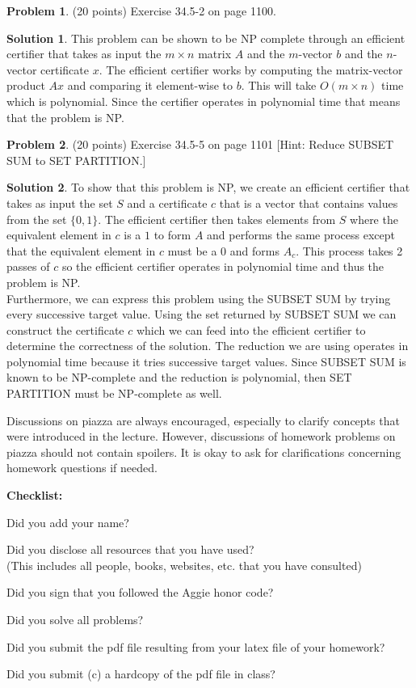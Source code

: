 \documentclass{article}
\theoremstyle{definition}
\newtheorem{problem}{Problem}
\newtheorem*{solution}{Solution}
\newcommand{\checklist}{\noindent\textbf{Checklist:}
\begin{compactitem}[$\Box$] 
\item Did you add your name? 
\item Did you disclose all resources that you have used? \\
(This includes all people, books, websites, etc. that you have consulted)
\item Did you sign that you followed the Aggie honor code? 
\item Did you solve all problems? 
\item Did you submit the pdf file resulting from your latex file 
  of your homework?
\item Did you submit (c) a hardcopy of the pdf file in class? 
\end{compactitem}
}
\begin{document}
\begin{problem} (20 points) %
Exercise 34.5-2 on page 1100. 
\end{problem}
\begin{solution}
This problem can be shown to be NP complete through an efficient certifier that takes as input the $m \times n$ matrix $A$ and the $m$-vector $b$ and the $n$-vector certificate $x$. The efficient certifier works by computing the matrix-vector product $Ax$ and comparing it element-wise to $b$. This will take $O(m \times n)$ time which is polynomial. Since the certifier operates in polynomial time that means that the problem is NP.
\end{solution}

\begin{problem} (20 points) %
Exercise 34.5-5 on page 1101 [Hint: Reduce SUBSET SUM
to SET PARTITION.] 
\end{problem}
\begin{solution}
To show that this problem is NP, we create an efficient certifier that takes as input the set $S$ and a certificate $c$ that is a vector that contains values from the set $\{0,1\}$. The efficient certifier then takes elements from $S$ where the equivalent element in $c$ is a $1$ to form $A$ and performs the same process except that the equivalent element in $c$ must be a 0 and forms $A_c$. This process takes 2 passes of $c$ so the efficient certifier operates in polynomial time and thus the problem is NP.\\
Furthermore, we can express this problem using the SUBSET SUM by trying every successive target value. Using the set returned by SUBSET SUM we can construct the certificate $c$ which we can feed into the efficient certifier to determine the correctness of the solution. The reduction we are using operates in polynomial time because it tries successive target values. Since SUBSET SUM is known to be NP-complete and the reduction is polynomial, then SET PARTITION must be NP-complete as well. 
\end{solution}

Discussions on piazza are always encouraged, especially to clarify
concepts that were introduced in the lecture. However, discussions of
homework problems on piazza should not contain spoilers. It is okay to
ask for clarifications concerning homework questions if needed. 
\medskip



\goodbreak
\checklist
\end{document}
